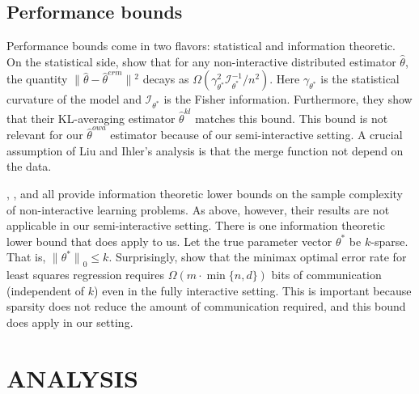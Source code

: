 \documentclass[twoside]{article}
\newcommand{\w}{\theta}
\newcommand{\wkl}{\hat\w^{kl}}
\newcommand{\wowa}{\hat\w^{owa}}
\newcommand{\wmle}{\hat\w^{erm}}
\newcommand{\wstar}{{\w^{*}}}
\newcommand{\what}{{\hat\w}}
\newcommand{\wq}{\hat\w^{q}}
\newcommand{\I}{\mathcal I}
\newcommand{\ltwo}[1]{{\lVert {#1} \rVert}}
\newcommand{\lzero}[1]{{\lVert {#1} \rVert}_0}
\begin{document}
\subsection{Performance bounds}
\label{sec:bounds}

Performance bounds come in two flavors: statistical and information theoretic.
On the statistical side, \citet{liu2014distributed} show that for any non-interactive distributed estimator $\what$,
the quantity $\ltwo{\what-\wmle}{}^2$ decays as $\Omega(\gamma^2_\wstar \I^{-1}_\wstar/n^2)$.
Here $\gamma_\wstar$ is the statistical curvature of the model and $\I_\wstar$ is the Fisher information.
Furthermore, they show that their KL-averaging estimator $\wkl$ matches this bound.
This bound is not relevant for our $\wowa$ estimator because of our semi-interactive setting.
A crucial assumption of Liu and Ihler's analysis is that the merge function not depend on the data.

\citet{shamir2014fundamental}, \citet{zhang2013information}, and \citet{garg2014communication} all provide information theoretic lower bounds on the sample complexity of non-interactive learning problems.
As above, however, their results are not applicable in our semi-interactive setting.
There is one information theoretic lower bound that does apply to us.
Let the true parameter vector $\wstar$ be $k$-sparse.
That is, $\lzero{\wstar} \le k$.
Surprisingly, \citet{braverman2015communication} show that the minimax optimal error rate for least squares regression requires $\Omega(m\cdot\min\{n,d\})$ bits of communication (independent of $k$) even in the fully interactive setting.
This is important because sparsity does not reduce the amount of communication required, and this bound does apply in our setting.

\section{ANALYSIS}
\label{sec:anal}
\end{document}

